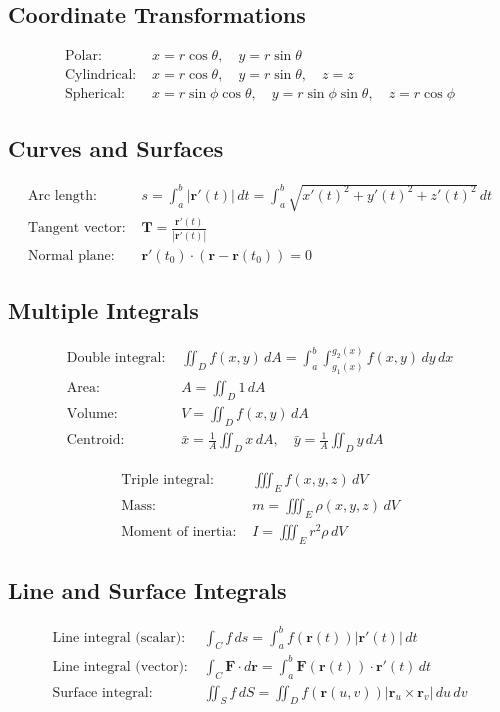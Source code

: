 \documentclass[10pt,twocolumn,a4paper]{article}
\begin{document}
\subsection{Coordinate Transformations}
\begin{align}
\text{Polar: } &x = r\cos\theta, \quad y = r\sin\theta\\
\text{Cylindrical: } &x = r\cos\theta, \quad y = r\sin\theta, \quad z = z\\
\text{Spherical: } &x = r\sin\phi\cos\theta, \quad y = r\sin\phi\sin\theta, \quad z = r\cos\phi
\end{align}

\subsection{Curves and Surfaces}
\begin{align}
\text{Arc length: } &s = \int_a^b |\mathbf{r}'(t)| \, dt = \int_a^b \sqrt{x'(t)^2 + y'(t)^2 + z'(t)^2} \, dt\\
\text{Tangent vector: } &\mathbf{T} = \frac{\mathbf{r}'(t)}{|\mathbf{r}'(t)|}\\
\text{Normal plane: } &\mathbf{r}'(t_0) \cdot (\mathbf{r} - \mathbf{r}(t_0)) = 0
\end{align}

\subsection{Multiple Integrals}
\begin{align}
\text{Double integral: } &\iint_D f(x,y) \, dA = \int_a^b \int_{g_1(x)}^{g_2(x)} f(x,y) \, dy \, dx\\
\text{Area: } &A = \iint_D 1 \, dA\\
\text{Volume: } &V = \iint_D f(x,y) \, dA\\
\text{Centroid: } &\bar{x} = \frac{1}{A}\iint_D x \, dA, \quad \bar{y} = \frac{1}{A}\iint_D y \, dA
\end{align}

\begin{align}
\text{Triple integral: } &\iiint_E f(x,y,z) \, dV\\
\text{Mass: } &m = \iiint_E \rho(x,y,z) \, dV\\
\text{Moment of inertia: } &I = \iiint_E r^2 \rho \, dV
\end{align}

\subsection{Line and Surface Integrals}
\begin{align}
\text{Line integral (scalar): } &\int_C f \, ds = \int_a^b f(\mathbf{r}(t)) |\mathbf{r}'(t)| \, dt\\
\text{Line integral (vector): } &\int_C \mathbf{F} \cdot d\mathbf{r} = \int_a^b \mathbf{F}(\mathbf{r}(t)) \cdot \mathbf{r}'(t) \, dt\\
\text{Surface integral: } &\iint_S f \, dS = \iint_D f(\mathbf{r}(u,v)) |\mathbf{r}_u \times \mathbf{r}_v| \, du \, dv
\end{align}
\end{document}
